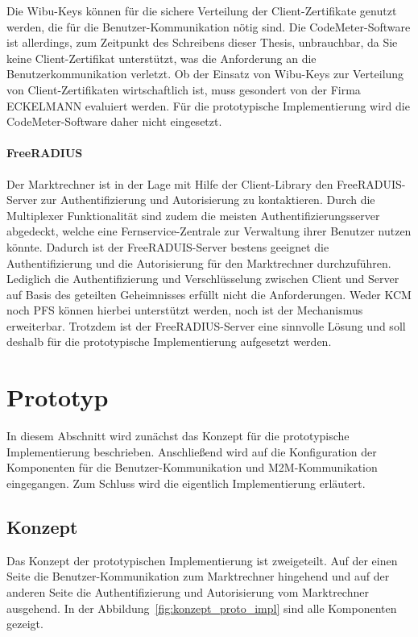 \documentclass[11pt,a4paper]{report}
\begin{document}
Die Wibu-Keys können für die sichere Verteilung der Client-Zertifikate genutzt werden, die für die Benutzer-Kommunikation nötig sind. Die CodeMeter-Software ist allerdings, zum Zeitpunkt des Schreibens dieser Thesis, unbrauchbar, da Sie keine Client-Zertifikat unterstützt, was die Anforderung an die Benutzerkommunikation verletzt. Ob der Einsatz von Wibu-Keys zur Verteilung von Client-Zertifikaten wirtschaftlich ist, muss gesondert von der Firma ECKELMANN evaluiert werden. Für die prototypische Implementierung wird die CodeMeter-Software daher nicht eingesetzt.

\paragraph{FreeRADIUS}

Der Marktrechner ist in der Lage mit Hilfe der Client-Library den FreeRADUIS-Server zur Authentifizierung und Autorisierung zu kontaktieren. Durch die Multiplexer Funktionalität sind zudem die meisten Authentifizierungsserver abgedeckt, welche eine Fernservice-Zentrale zur Verwaltung ihrer Benutzer nutzen könnte. Dadurch ist der FreeRADUIS-Server bestens geeignet die Authentifizierung und die Autorisierung für den Marktrechner durchzuführen. Lediglich die Authentifizierung und Verschlüsselung zwischen Client und Server auf Basis des geteilten Geheimnisses erfüllt nicht die Anforderungen. Weder KCM noch PFS können hierbei unterstützt werden, noch ist der Mechanismus erweiterbar.  Trotzdem ist der FreeRADIUS-Server eine sinnvolle Lösung und soll deshalb für die prototypische Implementierung aufgesetzt werden.

\section{Prototyp}

In diesem Abschnitt wird zunächst das Konzept für die prototypische Implementierung beschrieben. Anschließend wird auf die Konfiguration der Komponenten für die Benutzer-Kommunikation und M2M-Kommunikation eingegangen. Zum Schluss wird die eigentlich Implementierung erläutert.

\subsection{Konzept}

Das Konzept der prototypischen Implementierung ist zweigeteilt. Auf der einen Seite die Benutzer-Kommunikation zum Marktrechner hingehend und auf der anderen Seite die Authentifizierung und Autorisierung vom Marktrechner ausgehend. In der Abbildung~\ref{fig:konzept_proto_impl} sind alle Komponenten gezeigt.
\end{document}
